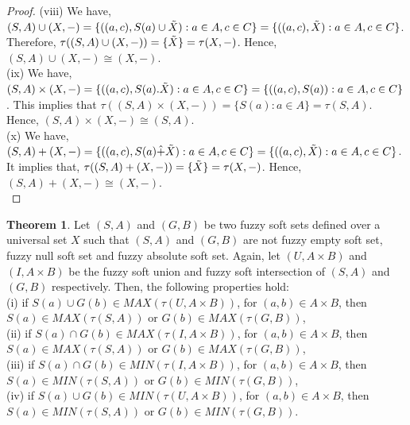 \documentclass{article}
\theoremstyle{definition}
\newtheorem{theorem}{Theorem}[section]
\begin{document}
\begin{proof}
(viii) We have, $(S, A)\cup (X, -)=\{((a,c), S(a)\cup \Tilde{X}) : a\in A, c\in C\}=\{((a,c), \Tilde{X}): a\in A, c\in C\}$. Therefore, $\tau((S,A)\cup (X, -))=\{\Tilde{X}\}=\tau(X, -)$. Hence, $(S, A) \cup (X, -) \cong (X, -)$.\\

(ix) We have, $(S,A) \times (X, -)=\{((a,c), S(a).\Tilde{X}) : a\in A, c\in C\}=\{((a,c), S(a)): a\in A, c\in C\} $. This implies that $\tau((S,A) \times (X, -))=\{S(a) : a\in A \}=\tau(S, A)$. Hence, $(S, A) \times (X, -) \cong (S, A)$.\\


(x) We have, $(S,A) + (X, -)=\{((a,c), S(a) \hat{+} \Tilde{X}) : a\in A, c\in C\}=\{((a,c), \Tilde{X}): a\in A, c\in C\}$. It implies that, $\tau((S,A) + (X, -))=\{\Tilde{X}\}=\tau(X, -)$. Hence, $(S, A) + (X, -) \cong (X, -)$.\\
\end{proof}
\begin{theorem}
     Let $(S,A)$ and $(G,B)$ be two fuzzy soft sets defined over a universal set $X$ such that $(S,A)$ and $(G,B)$ are not fuzzy empty soft set, fuzzy null soft set and fuzzy absolute soft set. Again, let $(U,A\times B)$ and $(I,A\times B)$ be the fuzzy soft union and fuzzy soft intersection of $(S,A)$ and $(G,B)$ respectively. Then, the following properties hold:\\

    (i) if $S(a)\cup G(b)\in MAX(\tau(U,A\times B))$, for $(a, b)\in A\times B$, then $S(a)\in MAX(\tau(S,A))$ or $G(b)\in MAX(\tau(G,B))$,\\

    (ii) if $S(a)\cap G(b)\in MAX(\tau(I,A\times B))$, for $(a, b)\in A\times B$, then $S(a)\in MAX(\tau(S,A))$ or $G(b)\in MAX(\tau(G,B))$,\\
    
    (iii) if $S(a)\cap G(b)\in MIN(\tau(I,A\times B))$, for $(a, b)\in A\times B$, then $S(a)\in MIN(\tau(S,A))$ or $G(b)\in MIN(\tau(G,B))$,\\

    (iv) if $S(a)\cup G(b)\in MIN(\tau(U,A\times B))$, for $(a, b)\in A\times B$, then $S(a)\in MIN(\tau(S,A))$ or $G(b)\in MIN(\tau(G,B))$.

    
    
    
\end{theorem}
\end{document}
